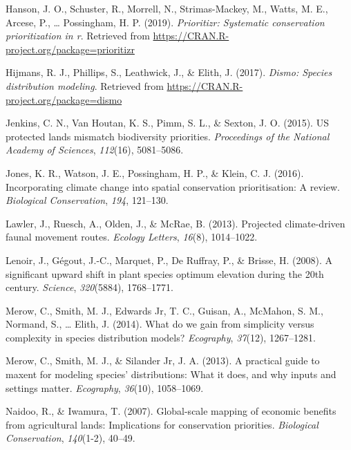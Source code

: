 \documentclass[]{article}
\begin{document}
\leavevmode\hypertarget{ref-Hanson2019}{}%
Hanson, J. O., Schuster, R., Morrell, N., Strimas-Mackey, M., Watts, M. E., Arcese, P., \ldots{} Possingham, H. P. (2019). \emph{Prioritizr: Systematic conservation prioritization in r}. Retrieved from \url{https://CRAN.R-project.org/package=prioritizr}

\leavevmode\hypertarget{ref-Hijmans_Dismo}{}%
Hijmans, R. J., Phillips, S., Leathwick, J., \& Elith, J. (2017). \emph{Dismo: Species distribution modeling}. Retrieved from \url{https://CRAN.R-project.org/package=dismo}

\leavevmode\hypertarget{ref-jenkins2015us}{}%
Jenkins, C. N., Van Houtan, K. S., Pimm, S. L., \& Sexton, J. O. (2015). US protected lands mismatch biodiversity priorities. \emph{Proceedings of the National Academy of Sciences}, \emph{112}(16), 5081--5086.

\leavevmode\hypertarget{ref-jones2016incorporating}{}%
Jones, K. R., Watson, J. E., Possingham, H. P., \& Klein, C. J. (2016). Incorporating climate change into spatial conservation prioritisation: A review. \emph{Biological Conservation}, \emph{194}, 121--130.

\leavevmode\hypertarget{ref-lawler2013projected}{}%
Lawler, J., Ruesch, A., Olden, J., \& McRae, B. (2013). Projected climate-driven faunal movement routes. \emph{Ecology Letters}, \emph{16}(8), 1014--1022.

\leavevmode\hypertarget{ref-lenoir2008significant}{}%
Lenoir, J., Gégout, J.-C., Marquet, P., De Ruffray, P., \& Brisse, H. (2008). A significant upward shift in plant species optimum elevation during the 20th century. \emph{Science}, \emph{320}(5884), 1768--1771.

\leavevmode\hypertarget{ref-merow2014we}{}%
Merow, C., Smith, M. J., Edwards Jr, T. C., Guisan, A., McMahon, S. M., Normand, S., \ldots{} Elith, J. (2014). What do we gain from simplicity versus complexity in species distribution models? \emph{Ecography}, \emph{37}(12), 1267--1281.

\leavevmode\hypertarget{ref-merow2013practical}{}%
Merow, C., Smith, M. J., \& Silander Jr, J. A. (2013). A practical guide to maxent for modeling species' distributions: What it does, and why inputs and settings matter. \emph{Ecography}, \emph{36}(10), 1058--1069.

\leavevmode\hypertarget{ref-naidoo2007global}{}%
Naidoo, R., \& Iwamura, T. (2007). Global-scale mapping of economic benefits from agricultural lands: Implications for conservation priorities. \emph{Biological Conservation}, \emph{140}(1-2), 40--49.
\end{document}
